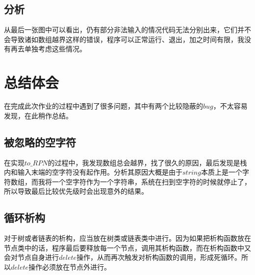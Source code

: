 \documentclass[UTF8]{ctexart}
\begin{document}
	\subsection{分析}\label{time_of_PrintLots}
	\indent 从最后一张图中可以看出，仍有部分非法输入的情况代码无法分别出来，它们并不会导致诸如数组越界这样的错误，程序可以正常运行、退出，加之时间有限，我没有再去单独考虑这些情况。
	

	\section{总结体会}
	\indent 在完成此次作业的过程中遇到了很多问题，其中有两个比较隐蔽的$bug$，不太容易发现，在此稍作总结。
	\subsection{被忽略的空字符}
	\indent 在实现$to\_RPN$的过程中，我发现数组总会越界，找了很久的原因，最后发现是栈内和输入末端的空字符没有起作用。分析其原因大概是由于$string$本质上是一个字符数组，而我将一个空字符作为一个字符串，系统在扫到空字符的时候就停止了，所以导致最后比较优先级时会出现意外的结果。
	
	\subsection{循环析构}
	\indent 对于树或者链表的析构，应当放在树类或链表类中进行。因为如果把析构函数放在节点类中的话，程序最后要释放每一个节点，调用其析构函数，而在析构函数中又会对节点自身进行$delete$操作，从而再次触发对析构函数的调用，形成死循环。所以$delete$操作必须放在节点外进行。


\end{document}
